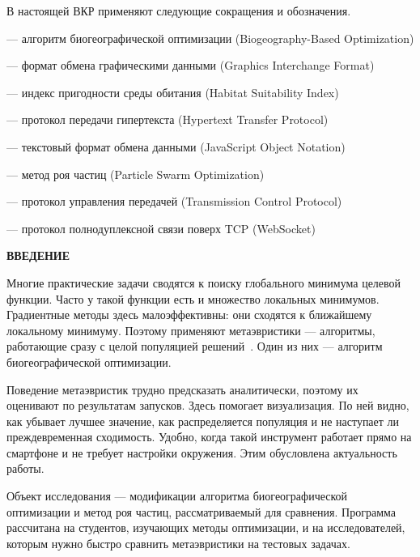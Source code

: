 \documentclass[14pt, a4paper]{extarticle}
\newcommand{\structelem}[1]{%
  \clearpage
  \phantomsection
  \addcontentsline{toc}{section}{#1}%
  \begin{center}\large\bfseries #1\end{center}
  \vspace{8pt}}
\begin{document}
В настоящей ВКР применяют следующие сокращения и обозначения.

\begin{description}[leftmargin=!, labelwidth=1.2cm, font=\normalfont, itemsep=2pt]
  \item[BBO] --- алгоритм биогеографической оптимизации (Biogeography-Based Optimization)
  \item[GIF] --- формат обмена графическими данными (Graphics Interchange Format)
  \item[HSI] --- индекс пригодности среды обитания (Habitat Suitability Index)
  \item[HTTP] --- протокол передачи гипертекста (Hypertext Transfer Protocol)
  \item[JSON] --- текстовый формат обмена данными (JavaScript Object Notation)
  \item[PSO] --- метод роя частиц (Particle Swarm Optimization)
  \item[TCP] --- протокол управления передачей (Transmission Control Protocol)
  \item[WS] --- протокол полнодуплексной связи поверх TCP (WebSocket)
\end{description}

\structelem{ВВЕДЕНИЕ}

Многие практические задачи сводятся к поиску глобального минимума целевой
функции. Часто у такой функции есть и множество локальных минимумов. Градиентные
методы здесь малоэффективны: они сходятся к ближайшему локальному минимуму. Поэтому применяют метаэвристики --- алгоритмы, работающие
сразу с целой популяцией решений~\cite{karpenko2021}. Один из них --- алгоритм
биогеографической оптимизации.

Поведение метаэвристик трудно предсказать аналитически, поэтому их оценивают по
результатам запусков. Здесь помогает визуализация. По ней видно, как убывает
лучшее значение, как распределяется популяция и не наступает ли преждевременная
сходимость. Удобно, когда такой инструмент работает прямо на смартфоне и не
требует настройки окружения. Этим обусловлена актуальность работы.

Объект исследования --- модификации алгоритма биогеографической оптимизации и
метод роя частиц, рассматриваемый для сравнения. Программа рассчитана на студентов,
изучающих методы оптимизации, и на исследователей, которым нужно быстро сравнить
метаэвристики на тестовых задачах.
\end{document}
